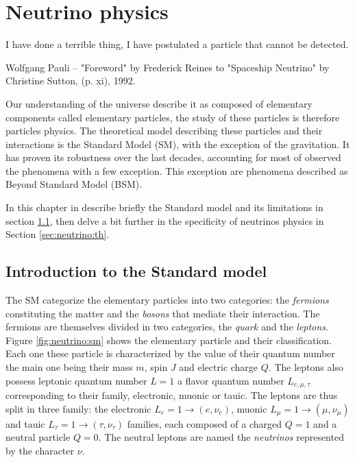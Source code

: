 \chapter{Neutrino physics}
\label{sec:neutrino}

\epigraph{I have done a terrible thing, I have postulated a particle that cannot be detected.}{Wolfgang Pauli -- "Foreword" by Frederick Reines to "Spaceship Neutrino" by Christine Sutton, (p. xi), 1992. }



\minitoc

Our understanding of the universe describe it as composed of elementary components called elementary particles, the study of these particles is therefore particles physics. The theoretical model describing these particles and their interactions is the Standard Model (SM), with the exception of the gravitation. It has proven its robustness over the last decades, accounting for most of observed the phenomena with a few exception. This exception are phenomena described as Beyond Standard Model (BSM).

In this chapter in describe briefly the Standard model and its limitations in section \ref{sec:neutrinos:sm}, then delve a bit further in the specificity of neutrinos physics in Section \ref{sec:neutrino:th}.

\section{Introduction to the Standard model}
\label{sec:neutrinos:sm}

The SM categorize the elementary particles into two categories: the \textit{fermions} constituting the matter and the \textit{bosons} that mediate their interaction. The fermions are themselves divided in two categories, the \textit{quark} and the \textit{leptons}. Figure \ref{fig:neutrino:sm} shows the elementary particle and their classification. Each one these particle is characterized by the value of their quantum number the main one being their mass $m$, spin $J$ and electric charge $Q$. The leptons also possess leptonic quantum number $L = 1$ a flavor quantum number $L_{e,\mu,\tau}$ corresponding to their family, electronic, muonic or tauic. The leptons are thus split in three family: the electronic $L_e = 1 \rightarrow (e, \nu_e)$, muonic $L_\mu = 1 \rightarrow (\mu, \nu_\mu)$ and tauic $L_\tau = 1 \rightarrow (\tau, \nu_\tau)$ families, each composed of a charged $Q = 1$ and a neutral particle $Q = 0$. The neutral leptons are named the \textit{neutrinos} represented by the character $\nu$.

